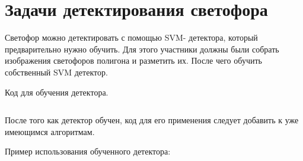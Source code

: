 \section{Задачи детектирования светофора}

Светофор можно детектировать с помощью SVM- детектора, который предварительно нужно обучить. Для этого участники должны были собрать изображения светофоров полигона и разметить их. После чего обучить собственный SVM детектор.

Код для обучения детектора.

\inputminted[fontsize=\footnotesize, linenos]{python}{final/command_tour/ats/task_04/source_1.py}

После того как детектор обучен, код для его применения следует добавить к уже имеющимся алгоритмам.

Пример использования обученного детектора:

\inputminted[fontsize=\footnotesize, linenos]{python}{final/command_tour/ats/task_04/source_2.py}